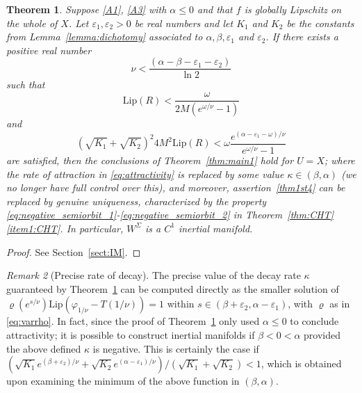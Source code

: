 \documentclass[a4paper, 12pt, oneside, reqno, notitlepage]{amsart}
\theoremstyle{plain}
\newtheorem{theorem}{Theorem}
\theoremstyle{definition}
\theoremstyle{remark}
\newtheorem{remark}[theorem]{Remark}
\newcommand{\lip}{\mathrm{Lip}}
\begin{document}
\begin{theorem} \label{thm:IM}
    Suppose \ref{A1}, \ref{A3} with $\alpha \leq 0$ and that $f$ is globally Lipschitz on the whole of $X$.
    Let $\varepsilon_1,\varepsilon_2 > 0$ be real numbers and let $K_1$ and $K_2$ be the constants from Lemma~\ref{lemma:dichotomy} associated to $\alpha,\beta,\varepsilon_1$ and $\varepsilon_2$.
    If there exists a positive real number
    \begin{equation}
        \nu < \frac{(\alpha-\beta-\varepsilon_1-\varepsilon_2)}{\ln2} 
        \label{eq:nu}
    \end{equation}
    such that
    \begin{equation}
        \lip(R) < \frac{\omega}{2M (e^{\omega /\nu} -1)}
        \label{eq:replacement}
    \end{equation}
    and 
    \begin{equation}
        \left(\sqrt{K_1} + \sqrt{K_2} \right)^2 4M^2  \lip(R) < \omega \frac{e^{(\alpha - \varepsilon_1-\omega)/\nu}    }{e^{\omega /\nu} - 1}
        \label{eq:nu_cond_2}
    \end{equation}
    are satisfied,
    then the conclusions of Theorem~\ref{thm:main1} hold for $U = X$; where the rate of attraction in \eqref{eq:attractivity} is replaced by some value $\kappa \in (\beta,\alpha)$ (we no longer have full control over this), and moreover, assertion~\ref{thm1st4} can be replaced by genuine uniqueness, characterized by the property \eqref{eq:negative_semiorbit_1}-\eqref{eq:negative_semiorbit_2} in Theorem~\ref{thm:CHT}\ref{item1:CHT}. 
    In particular, $W^\Sigma$ is a $C^1$ inertial manifold.
\end{theorem}

\begin{proof}
    See Section~\ref{sect:IM}.
\end{proof}

\begin{remark}[Precise rate of decay] \label{remark:varrho}
    The precise value of the decay rate $\kappa$ guaranteed by Theorem~\ref{thm:IM} can be computed directly as the smaller solution of $\varrho(e^{s/\nu}) \lip(\varphi_{1/\nu}-T(1/\nu)) = 1$ within $s \in (\beta+\varepsilon_2,\alpha-\varepsilon_1)$, with $\varrho$ as in \eqref{eq:varrho}.
    In fact, since the proof of Theorem~\ref{thm:IM} only used $\alpha \leq 0$ to conclude attractivity; it is possible to construct inertial manifolds if $\beta < 0 < \alpha$ provided the above defined $\kappa$ is negative.
    This is certainly the case if $(\sqrt{K_1} e^{(\beta+\varepsilon_2)/\nu} + \sqrt{K_2} e^{(\alpha-\varepsilon_1)/\nu})/(\sqrt{K_1}+\sqrt{K_2}) < 1$, which is obtained upon examining the minimum of the above function in $(\beta,\alpha)$. 
\end{remark}
\end{document}
